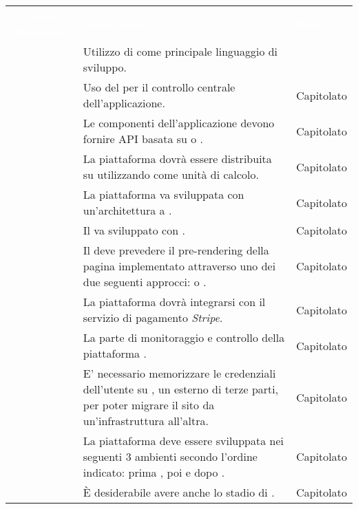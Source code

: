 \renewcommand{\arraystretch}{1.5}
\begin{longtable}{|c C{9.5cm} C{2.5cm}|} 
	
	\textcolor{white}{\textbf{Codice Requisito}}&
	\textcolor{white}{\textbf{Descrizione}}&
	\textcolor{white}{\textbf{Fonte}}\\
	 & Utilizzo di  come principale linguaggio di sviluppo. &  \\
	
	 & Uso del   per il controllo centrale dell'applicazione. & Capitolato \\
	
	 & Le componenti dell'applicazione devono fornire API basata su  o . & Capitolato \\
	
	 & La piattaforma dovrà essere distribuita su  utilizzando  come unità di calcolo. & Capitolato \\
	
	 & La piattaforma va sviluppata con un'architettura a . & Capitolato \\
	
	 & Il  va sviluppato con . & Capitolato \\
	
	 & Il  deve prevedere il pre-rendering della pagina  implementato attraverso uno dei due seguenti approcci:  o . & Capitolato \\
	
	 & La piattaforma dovrà integrarsi con il servizio di pagamento \textit{Stripe}. & Capitolato \\
	
	 & La parte di monitoraggio e controllo della piattaforma . & Capitolato \\
	
	 & E' necessario memorizzare le credenziali dell'utente su , un  esterno di terze parti, per poter migrare il sito da un'infrastruttura all'altra. & Capitolato \\
	
	 & La piattaforma deve essere sviluppata nei seguenti 3 ambienti secondo l'ordine indicato: prima , poi  e dopo . & Capitolato \\
	
	 & È desiderabile avere anche lo stadio di . & Capitolato \\
\end{longtable}

